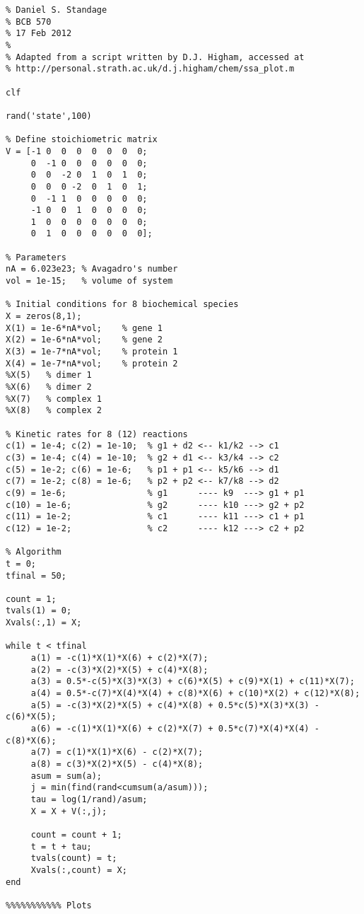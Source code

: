 \documentclass[a4paper, 10pt]{article}
\begin{document}
\begin{verbatim}
% Daniel S. Standage
% BCB 570
% 17 Feb 2012
%
% Adapted from a script written by D.J. Higham, accessed at
% http://personal.strath.ac.uk/d.j.higham/chem/ssa_plot.m

clf

rand('state',100)

% Define stoichiometric matrix
V = [-1 0  0  0  0  0  0  0;
     0  -1 0  0  0  0  0  0;
     0  0  -2 0  1  0  1  0;
     0  0  0 -2  0  1  0  1;
     0  -1 1  0  0  0  0  0;
     -1 0  0  1  0  0  0  0;
     1  0  0  0  0  0  0  0;
     0  1  0  0  0  0  0  0];

% Parameters
nA = 6.023e23; % Avagadro's number
vol = 1e-15;   % volume of system

% Initial conditions for 8 biochemical species
X = zeros(8,1);
X(1) = 1e-6*nA*vol;    % gene 1
X(2) = 1e-6*nA*vol;    % gene 2
X(3) = 1e-7*nA*vol;    % protein 1
X(4) = 1e-7*nA*vol;    % protein 2
%X(5)   % dimer 1
%X(6)   % dimer 2
%X(7)   % complex 1
%X(8)   % complex 2

% Kinetic rates for 8 (12) reactions
c(1) = 1e-4; c(2) = 1e-10;  % g1 + d2 <-- k1/k2 --> c1
c(3) = 1e-4; c(4) = 1e-10;  % g2 + d1 <-- k3/k4 --> c2
c(5) = 1e-2; c(6) = 1e-6;   % p1 + p1 <-- k5/k6 --> d1
c(7) = 1e-2; c(8) = 1e-6;   % p2 + p2 <-- k7/k8 --> d2
c(9) = 1e-6;                % g1      ---- k9  ---> g1 + p1
c(10) = 1e-6;               % g2      ---- k10 ---> g2 + p2
c(11) = 1e-2;               % c1      ---- k11 ---> c1 + p1
c(12) = 1e-2;               % c2      ---- k12 ---> c2 + p2

% Algorithm
t = 0;
tfinal = 50;

count = 1;
tvals(1) = 0;
Xvals(:,1) = X;

while t < tfinal
     a(1) = -c(1)*X(1)*X(6) + c(2)*X(7);
     a(2) = -c(3)*X(2)*X(5) + c(4)*X(8);
     a(3) = 0.5*-c(5)*X(3)*X(3) + c(6)*X(5) + c(9)*X(1) + c(11)*X(7);
     a(4) = 0.5*-c(7)*X(4)*X(4) + c(8)*X(6) + c(10)*X(2) + c(12)*X(8);
     a(5) = -c(3)*X(2)*X(5) + c(4)*X(8) + 0.5*c(5)*X(3)*X(3) - c(6)*X(5);
     a(6) = -c(1)*X(1)*X(6) + c(2)*X(7) + 0.5*c(7)*X(4)*X(4) - c(8)*X(6);
     a(7) = c(1)*X(1)*X(6) - c(2)*X(7);
     a(8) = c(3)*X(2)*X(5) - c(4)*X(8);
     asum = sum(a);
     j = min(find(rand<cumsum(a/asum)));
     tau = log(1/rand)/asum;
     X = X + V(:,j);
    
     count = count + 1;
     t = t + tau;
     tvals(count) = t;
     Xvals(:,count) = X;
end

%%%%%%%%%%% Plots


\end{verbatim}
\end{document}
